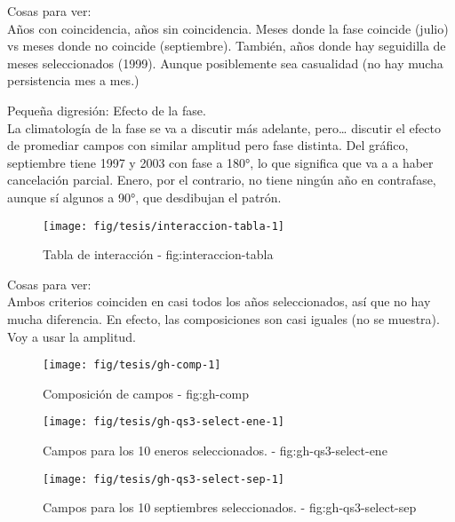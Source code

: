 \documentclass[spanish,a4paper]{book}
\begin{document}
Cosas para ver:\\
Años con coincidencia, años sin coincidencia. Meses donde la fase
coincide (julio) vs meses donde no coincide (septiembre). También, años
donde hay seguidilla de meses seleccionados (1999). Aunque posiblemente
sea casualidad (no hay mucha persistencia mes a mes.)

Pequeña digresión: Efecto de la fase.\\
La climatología de la fase se va a discutir más adelante, pero\ldots{}
discutir el efecto de promediar campos con similar amplitud pero fase
distinta. Del gráfico, septiembre tiene 1997 y 2003 con fase a 180°, lo
que significa que va a a haber cancelación parcial. Enero, por el
contrario, no tiene ningún año en contrafase, aunque sí algunos a 90°,
que desdibujan el patrón.

\begin{figure}

{\centering \texttt{[image: fig/tesis/interaccion-tabla-1]} 

}

\caption{Tabla de interacción - fig:interaccion-tabla}\label{fig:interaccion-tabla}
\end{figure}

Cosas para ver:\\
Ambos criterios coinciden en casi todos los años seleccionados, así que
no hay mucha diferencia. En efecto, las composiciones son casi iguales
(no se muestra). Voy a usar la amplitud.

\begin{landscape}\begin{figure}

{\centering \texttt{[image: fig/tesis/gh-comp-1]} 

}

\caption{Composición de campos - fig:gh-comp}\label{fig:gh-comp}
\end{figure}
\end{landscape}

\begin{figure}

{\centering \texttt{[image: fig/tesis/gh-qs3-select-ene-1]} 

}

\caption{Campos para los 10 eneros seleccionados. - fig:gh-qs3-select-ene}\label{fig:gh-qs3-select-ene}
\end{figure}

\begin{figure}

{\centering \texttt{[image: fig/tesis/gh-qs3-select-sep-1]} 

}

\caption{Campos para los 10 septiembres seleccionados. - fig:gh-qs3-select-sep}\label{fig:gh-qs3-select-sep}
\end{figure}
\end{document}
